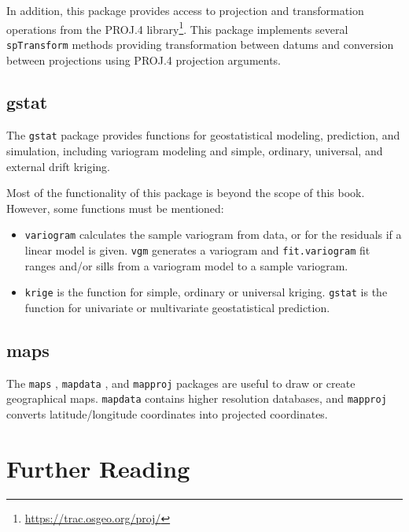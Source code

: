 In addition, this package provides access to projection and
transformation operations from the PROJ.4
library\footnote{\url{https://trac.osgeo.org/proj/}}. This package
implements several \texttt{spTransform} methods providing
transformation between datums and conversion between projections using
PROJ.4 projection arguments.


\subsection{gstat}
\label{sec:gstat}

The \texttt{gstat} package \cite{Pebesma2004} provides functions for
geostatistical modeling, prediction, and simulation, including
variogram modeling and simple, ordinary, universal, and external drift
kriging.

Most of the functionality of this package is beyond the scope of this
book. However, some functions must be mentioned:
\begin{itemize}
\item \texttt{variogram} calculates the sample variogram from data, or
  for the residuals if a linear model is given. \texttt{vgm} generates
  a variogram and \texttt{fit.variogram} fit ranges and/or sills from
  a variogram model to a sample variogram.
\item \texttt{krige} is the function for simple, ordinary or universal
  kriging. \texttt{gstat} is the function for univariate or
  multivariate geostatistical prediction.
\end{itemize}

\subsection{maps}
\label{sec:maps}

The \texttt{maps} \cite{Becker.Wilks.ea2013}, \texttt{mapdata}
\cite{Becker.Wilks.ea2013b}, and \texttt{mapproj}
\cite{McIlroy.Brownrigg.ea2013} packages are useful to draw or create
geographical maps. \texttt{mapdata} contains higher resolution
databases, and \texttt{mapproj} converts latitude/longitude
coordinates into projected coordinates.


\section{Further Reading}
\label{cha:further-reading-spatial}

